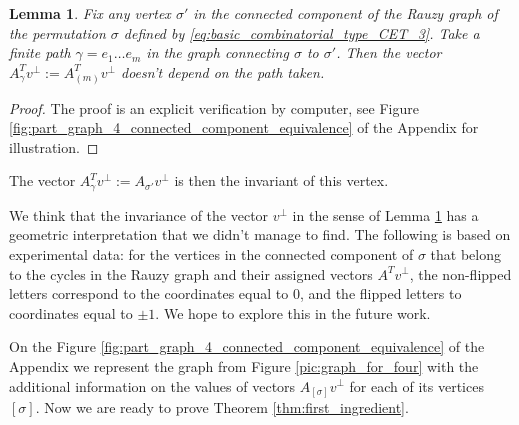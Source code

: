\documentclass[12pt]{article}
\newtheorem{lemma}{Lemma}
\theoremstyle{definition}
\begin{document}
\begin{lemma}\label{lemma:main_vector_preserved_lemma}
Fix any vertex $\sigma'$ in the connected component of the Rauzy graph of the permutation $\sigma$ defined by \eqref{eq:basic_combinatorial_type_CET_3}. Take a finite path $\gamma=e_1 \ldots e_m$ in the graph connecting $\sigma$ to $\sigma'$. Then the vector $A_{\gamma}^T v^{\perp}:=A_{(m)}^{T} v^{\perp}$ doesn't depend on the path taken. 
\end{lemma}
\begin{proof}
The proof is an explicit verification by computer, see Figure \ref{fig:part_graph_4_connected_component_equivalence} of the Appendix for illustration.
 \end{proof}


The vector $A_{\gamma}^T v^{\perp}:=A_{\sigma'} v^{\perp}$ is then the invariant of this vertex.


We think that the invariance of the vector $v^{\perp}$ in the sense of Lemma \ref{lemma:main_vector_preserved_lemma} has a geometric interpretation that we didn't manage to find. The following is based on experimental data: for the vertices in the connected component of $\sigma$ that belong to the cycles in the Rauzy graph and their assigned vectors $A^T v^{\perp}$, the non-flipped letters correspond to the coordinates equal to $0$, and the flipped letters to coordinates equal to $\pm 1$. We hope to explore this in the future work. 

On the Figure \ref{fig:part_graph_4_connected_component_equivalence} of the Appendix we represent 
the graph from Figure \ref{pic:graph_for_four} with the additional information on the values of vectors $A_{[\sigma]} v^{\perp}$ for each of its vertices $[\sigma]$. Now we are ready to prove Theorem \ref{thm:first_ingredient}.
\end{document}
